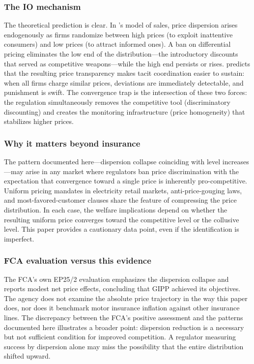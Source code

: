 \documentclass[12pt]{article}
\begin{document}
\subsubsection*{The IO mechanism} The theoretical prediction is clear. In \citet{varian1980model}'s model of sales, price dispersion arises endogenously as firms randomize between high prices (to exploit inattentive consumers) and low prices (to attract informed ones). A ban on differential pricing eliminates the low end of the distribution---the introductory discounts that served as competitive weapons---while the high end persists or rises. \citet{stigler1964theory} predicts that the resulting price transparency makes tacit coordination easier to sustain: when all firms charge similar prices, deviations are immediately detectable, and punishment is swift. The convergence trap is the intersection of these two forces: the regulation simultaneously removes the competitive tool (discriminatory discounting) and creates the monitoring infrastructure (price homogeneity) that stabilizes higher prices.

\subsubsection*{Why it matters beyond insurance} The pattern documented here---dispersion collapse coinciding with level increases---may arise in any market where regulators ban price discrimination with the expectation that convergence toward a single price is inherently pro-competitive. Uniform pricing mandates in electricity retail markets, anti-price-gouging laws, and most-favored-customer clauses share the feature of compressing the price distribution. In each case, the welfare implications depend on whether the resulting uniform price converges toward the competitive level or the collusive level. This paper provides a cautionary data point, even if the identification is imperfect.

\subsubsection*{FCA evaluation versus this evidence} The FCA's own EP25/2 evaluation emphasizes the dispersion collapse and reports modest net price effects, concluding that GIPP achieved its objectives. The agency does not examine the absolute price trajectory in the way this paper does, nor does it benchmark motor insurance inflation against other insurance lines. The discrepancy between the FCA's positive assessment and the patterns documented here illustrates a broader point: dispersion reduction is a necessary but not sufficient condition for improved competition. A regulator measuring success by dispersion alone may miss the possibility that the entire distribution shifted upward.
\end{document}
